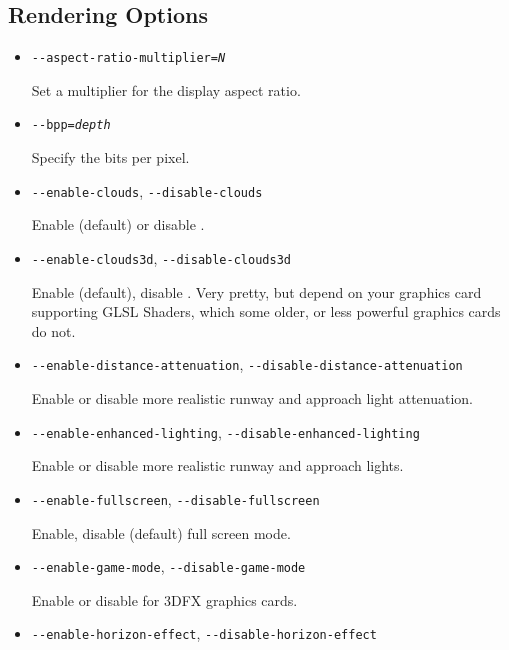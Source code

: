 \subsection{Rendering Options}
\begin{itemize}

\item{\texttt{-$ $-aspect-ratio-multiplier={\it N}}}

Set a multiplier for the display aspect ratio.

\item{\texttt{-$ $-bpp={\it depth}}}

Specify the bits per pixel.

\item{\texttt{-$ $-enable-clouds}, \texttt{-$ $-disable-clouds}}

Enable (default) or disable .

\item{\texttt{-$ $-enable-clouds3d}, \texttt{-$ $-disable-clouds3d}}

Enable (default), disable . Very pretty, but depend on your graphics card supporting
GLSL Shaders, which some older, or less powerful graphics cards do not.

\item{\texttt{-$ $-enable-distance-attenuation}, \texttt{-$ $-disable-distance-attenuation}}

Enable or disable more realistic runway and approach light attenuation.

\item{\texttt{-$ $-enable-enhanced-lighting}, \texttt{-$ $-disable-enhanced-lighting}}

Enable or disable more realistic runway and approach lights.

\item{\texttt{-$ $-enable-fullscreen}, \texttt{-$ $-disable-fullscreen}}

Enable, disable (default) full screen mode.

\item{\texttt{-$ $-enable-game-mode}, \texttt{-$ $-disable-game-mode}}

Enable or disable  for 3DFX graphics cards.

\item{\texttt{-$ $-enable-horizon-effect}, \texttt{-$ $-disable-horizon-effect}}


\end{itemize}
